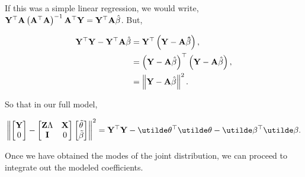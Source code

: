 \documentclass[10pt]{article}
\begin{document}
If this was a simple linear regression, we would write, ${\bf Y}^\top{\bf A}\left({\bf A}^\top{\bf
    A}\right)^{-1}{\bf A}^\top{\bf Y} = {\bf Y}^\top{\bf A}\hat\beta$. But,

\begin{align*}
{\bf Y}^\top{\bf Y} - {\bf Y}^\top{\bf A}\hat\beta & =
\bf{Y}^\top\left({\bf Y} - {\bf A}\hat\beta\right), \\
& = \left({\bf Y} - {\bf A}\hat\beta\right)^\top\left({\bf Y} - {\bf
    A}\hat\beta\right), \\
& = \left\|{\bf Y} - {\bf A}\hat\beta\right\|^2.
\end{align*}

So that in our full model,

\begin{equation*}
\left\|
\begin{bmatrix} {\bf Y} \\ 0 \end{bmatrix}
-\begin{bmatrix}{\bf Z}\Lambda & {\bf X} \\ {\bf I} & 0 \end{bmatrix}
\begin{bmatrix}\tilde\theta \\ \tilde\beta\end{bmatrix}
\right\|^2 =
{\bf Y}^\top{\bf Y} - \utilde\theta^\top\utilde\theta -
\utilde\beta^\top\utilde\beta.
\end{equation*}

Once we have obtained the modes of the joint distribution, we can proceed to
integrate out the modeled coefficients.
\end{document}
